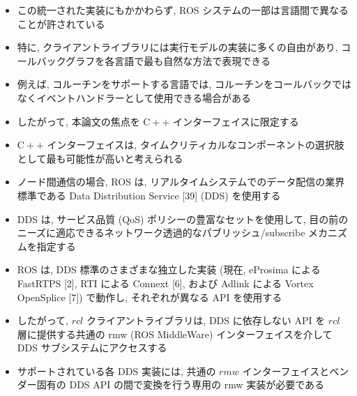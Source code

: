 \begin{frame}{}
    \begin{itemize}
        \item この統一された実装にもかかわらず, ROS システムの一部は言語間で異なることが許されている
        \item 特に, クライアントライブラリには実行モデルの実装に多くの自由があり, コールバックグラフを各言語で最も自然な方法で表現できる
        \item 例えば, コルーチンをサポートする言語では, コルーチンをコールバックではなくイベントハンドラーとして使用できる場合がある
        \item したがって, 本論文の焦点を $\mathrm{C}++$ インターフェイスに限定する
        \item $\mathrm{C}++$ インターフェイスは, タイムクリティカルなコンポーネントの選択肢として最も可能性が高いと考えられる
    \end{itemize}
\end{frame}

\begin{frame}{}
    \begin{itemize}
        \item ノード間通信の場合, ROS は, リアルタイムシステムでのデータ配信の業界標準である Data Distribution Service [39] (DDS) を使用する
        \item DDS は, サービス品質 (QoS) ポリシーの豊富なセットを使用して, 目の前のニーズに適応できるネットワーク透過的なパブリッシュ/subscribe メカニズムを指定する
    \end{itemize}
\end{frame}

\begin{frame}{}
    \begin{itemize}
        \item ROS は, DDS 標準のさまざまな独立した実装 (現在, eProsima による FastRTPS [2], RTI による Connext [6], および Adlink による Vortex OpenSplice [7]) で動作し, それぞれが異なる API を使用する
        \item したがって, $r c l$ クライアントライブラリは, DDS に依存しない API を $r c l$ 層に提供する共通の rmw (ROS MiddleWare) インターフェイスを介して DDS サブシステムにアクセスする
        \item サポートされている各 DDS 実装には, 共通の $r m w$ インターフェイスとベンダー固有の DDS API の間で変換を行う専用の rmw 実装が必要である
    \end{itemize}
\end{frame}

